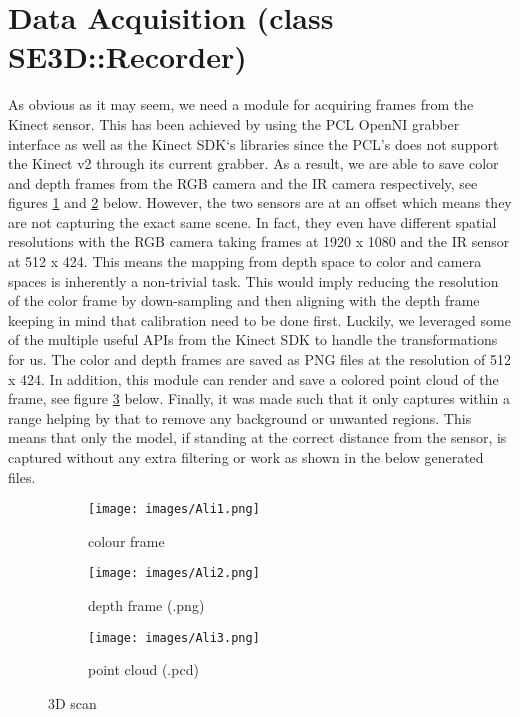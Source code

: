 \documentclass[a4paper]{report}
\begin{document}
\section{Data Acquisition (class SE3D::Recorder)}
As obvious as it may seem, we need a module for acquiring frames from the Kinect sensor. This has been achieved by using the PCL OpenNI grabber interface as well as the Kinect SDK‘s libraries since the PCL's does not support the Kinect v2 through its current grabber. As a result, we are able to save color and depth frames from the RGB camera and the IR camera respectively, see figures \ref{Ali1} and \ref{Ali2} below. However, the two sensors are at an offset which means they are not capturing the exact same scene. In fact, they even have different spatial resolutions with the RGB camera taking frames at 1920 x 1080 and the IR sensor at 512 x 424.
This means the mapping from depth space to color and camera spaces is inherently a non-trivial task. This would imply reducing the resolution of the color frame by down-sampling and then aligning with the depth frame keeping in mind that calibration need to be done first. Luckily, we leveraged some of the multiple useful APIs from the Kinect SDK to handle the transformations for us.
The color and depth frames are saved as PNG files at the resolution of 512 x 424.
In addition, this module can render and save a colored point cloud of the frame, see figure \ref{Ali3} below.
Finally, it was made such that it only captures within a range helping by that to remove any background or unwanted regions. This means that only the model, if standing at the correct distance from the sensor, is captured without any extra filtering or work as shown in the below generated files.
\begin{figure}[h]
\begin{subfigure}{0.5\textwidth}
\texttt{[image: images/Ali1.png]}
\caption{colour frame}
\label{Ali1} 
\end{subfigure}
\begin{subfigure}{0.5\textwidth}
\texttt{[image: images/Ali2.png]}
\caption{depth frame (.png)}
\label{Ali2} 
\end{subfigure}
\begin{subfigure}{0.5\textwidth}
\texttt{[image: images/Ali3.png]}
\caption{point cloud (.pcd)}
\label{Ali3} 
\end{subfigure}
\caption{3D scan}
\label{3d_scan}
\end{figure}
\end{document}
